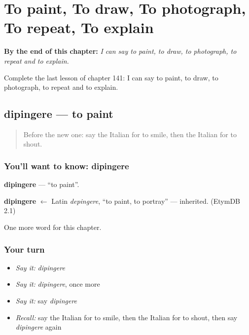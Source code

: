 
\chapter{To paint, To draw, To photograph, To repeat, To explain}
\label{ch:it-to-paint-to-draw-to-photograph-to-repeat-to-explain}

\begin{chapteropening}
\textbf{By the end of this chapter:} \emph{I can say to paint, to draw, to photograph, to repeat and to explain.}

Complete the last lesson of chapter 141: I can say to paint, to draw, to photograph, to repeat and to explain.
\end{chapteropening}

\section[dipingere]{dipingere — to paint}

\label{lesson:IT-C141-dipingere}



\begin{quote}
Before the new one: say the Italian for to smile, then the Italian for to shout.
\end{quote}

\subsection*{You'll want to know: dipingere}
\textbf{dipingere} — \textquotedblleft{}to paint\textquotedblright{}.

\begin{cousinweb}
\textbf{dipingere} $\leftarrow$ Latin \emph{depingere}, \textquotedblleft{}to paint, to portray\textquotedblright{} — inherited. (EtymDB 2.1)
\end{cousinweb}

\begin{grammarlens}[title={What you've built}]
One more word for this chapter.
\end{grammarlens}

\subsection*{Your turn}
\begin{itemize}
\raggedright
  \item \emph{Say it:} \emph{dipingere}
  \item \emph{Say it:} \emph{dipingere}, once more
  \item \emph{Say it:} say \emph{dipingere}
  \item \emph{Recall:} say the Italian for to smile, then the Italian for to shout, then say \emph{dipingere} again
\end{itemize}

